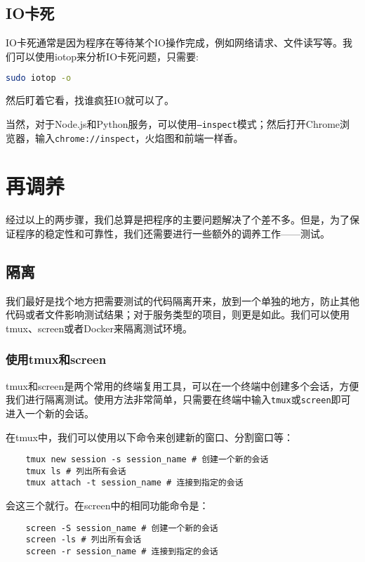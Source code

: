 \subsection{IO卡死}

IO卡死通常是因为程序在等待某个IO操作完成，例如网络请求、文件读写等。我们可以使用iotop来分析IO卡死问题，只需要:
\begin{lstlisting}[language=bash]
    sudo iotop -o
\end{lstlisting}
然后盯着它看，找谁疯狂IO就可以了。

当然，对于Node.js和Python服务，可以使用\texttt{--inspect}模式；然后打开Chrome浏览器，输入\texttt{chrome://inspect}，火焰图和前端一样香。

\section{再调养}

经过以上的两步骤，我们总算是把程序的主要问题解决了个差不多。但是，为了保证程序的稳定性和可靠性，我们还需要进行一些额外的调养工作——测试。

\subsection{隔离}

我们最好是找个地方把需要测试的代码隔离开来，放到一个单独的地方，防止其他代码或者文件影响测试结果；对于服务类型的项目，则更是如此。我们可以使用tmux、screen或者Docker来隔离测试环境。

\subsubsection{使用tmux和screen}

tmux和screen是两个常用的终端复用工具，可以在一个终端中创建多个会话，方便我们进行隔离测试。使用方法非常简单，只需要在终端中输入\texttt{tmux}或\texttt{screen}即可进入一个新的会话。

在tmux中，我们可以使用以下命令来创建新的窗口、分割窗口等：
\begin{lstlisting}
    tmux new session -s session_name # 创建一个新的会话
    tmux ls # 列出所有会话
    tmux attach -t session_name # 连接到指定的会话
\end{lstlisting}
会这三个就行。在screen中的相同功能命令是：
\begin{lstlisting}
    screen -S session_name # 创建一个新的会话
    screen -ls # 列出所有会话
    screen -r session_name # 连接到指定的会话
\end{lstlisting}

